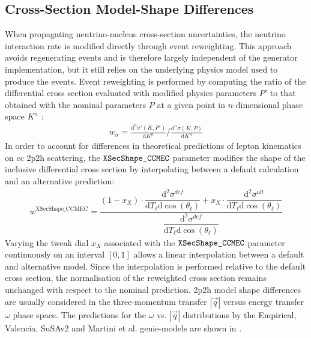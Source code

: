 \subsection{Cross-Section Model-Shape Differences} \label{sec:xsecshapeccmec}
When propagating neutrino-nucleus cross-section uncertainties, the neutrino interaction rate is modified directly through event reweighting. This approach avoids regenerating events and is therefore largely independent of the generator implementation, but it still relies on the underlying physics model used to produce the events. Event reweighting is performed by computing the ratio of the differential
cross section evaluated with modified physics parameters $P'$ to that
obtained with the nominal parameters $P$ at a given point in $n$-dimensional phase
space $K^n$ \cite{Andreopoulos:2009rq}:
%
\begin{align} \label{event_weight}
    w_\sigma = \frac{\text{d}^n\sigma'(K,P')}{\text{d}K^n} \bigg/ \frac{\text{d}^n\sigma(K,P)}{\text{d}K^n}
\end{align}
%
In order to account for differences in theoretical predictions of lepton kinematics on \acrshort{cc} \acrshort{2p2h} scattering, the $\verb!XSecShape_CCMEC!$ parameter modifies the shape of the inclusive differential cross section by interpolating between a default calculation and an alternative prediction:
%
\begin{align} \label{weight_XSecShape_CCMEC}
    w^\text{XSecShape\_CCMEC} = \dfrac{(1-x_X) \cdot \dfrac{\mathrm{d}^2\sigma^{def}}{\mathrm{d}T_\ell \mathrm{d}\cos(\theta_\ell)} + x_X \cdot \dfrac{\mathrm{d}^2\sigma^{alt}}{\mathrm{d}T_\ell \mathrm{d}\cos(\theta_\ell)}}{\dfrac{\mathrm{d}^2\sigma^{def}}{\mathrm{d}T_\ell \mathrm{d}\cos(\theta_\ell)}}
\end{align}
%
Varying the tweak dial $x_X$ associated with the $\verb!XSecShape_CCMEC!$ parameter continuously on an interval $[0,1]$ allows a linear interpolation between a default and alternative model. Since the interpolation is performed relative to the default cross section, the normalisation of the reweighted cross section remains unchanged with respect to the nominal prediction. \acrshort{2p2h} model shape differences are usually considered in the three-momentum transfer $|\vec{q}|$ versus energy transfer $\omega$ phase space. The predictions for the $\omega$ vs. $|\vec{q}|$ distributions by the Empirical, Valencia, SuSAv2 and Martini et al. \acrshort{genie}-models are shown in .
